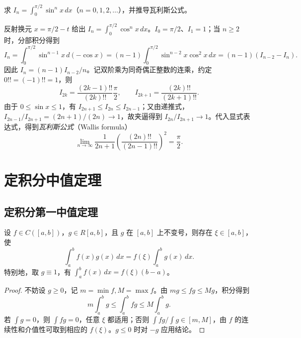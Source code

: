 \documentclass[UTF8,12pt,a4paper,fontset=fandol]{ctexbook}
\begin{document}
\begin{example}
\label{ex:wallis-recurrence-and-product}
求 $I_n=\int_0^{\pi/2}\sin^nx\,dx$（$n=0,1,2,\ldots$），并推导瓦利斯公式。
\end{example}
\begin{solve}
反射换元 $x=\pi/2-t$ 给出 $I_n=\int_0^{\pi/2}\cos^nx\,dx$。$I_0=\pi/2$、$I_1=1$；当 $n\geq2$ 时，分部积分得到
\[
    I_n=\int_0^{\pi/2}\sin^{n-1}x\,d(-\cos x)
    =(n-1)\int_0^{\pi/2}\sin^{n-2}x\cos^2x\,dx
    =(n-1)(I_{n-2}-I_n).
\]
因此 $I_n=(n-1)I_{n-2}/n$。记双阶乘为同奇偶正整数的连乘，约定 $0!!=(-1)!!=1$，则
\[
    I_{2k}=\frac{(2k-1)!!}{(2k)!!}\frac{\pi}{2},\qquad
    I_{2k+1}=\frac{(2k)!!}{(2k+1)!!}.
\]
由于 $0\leq\sin x\leq1$，有 $I_{2n+1}\leq I_{2n}\leq I_{2n-1}$；又由递推式，$I_{2n-1}/I_{2n+1}=(2n+1)/(2n)\to1$，故夹逼得到 $I_{2n}/I_{2n+1}\to1$。代入显式表达式，得到\emph{瓦利斯公式}（Wallis formula）
\begin{equation}
    \lim_{n\to\infty}
    \frac1{2n+1}\left(\frac{(2n)!!}{(2n-1)!!}\right)^2
    =\frac{\pi}{2}.
    \label{eq:wallis-product-limit}
\end{equation}
\end{solve}

\section{定积分中值定理}
\label{sec:integral-mean-value-theorems}

\subsection{定积分第一中值定理}
\label{subsec:first-integral-mean-value-theorem}

\begin{theorem}[定积分第一中值定理]
\label{thm:first-integral-mean-value}
设 $f\in C([a,b])$，$g\in R[a,b]$，且 $g$ 在 $[a,b]$ 上不变号，则存在 $\xi\in[a,b]$，使
\begin{equation}
    \int_a^b f(x)g(x)\,dx=f(\xi)\int_a^b g(x)\,dx.
    \label{eq:first-integral-mean-value}
\end{equation}
特别地，取 $g\equiv1$，有 $\int_a^b f(x)\,dx=f(\xi)(b-a)$。
\end{theorem}
\begin{proof}
不妨设 $g\geq0$，记 $m=\min f,M=\max f$。由 $mg\leq fg\leq Mg$，积分得到
\[
    m\int_a^b g\leq\int_a^b fg\leq M\int_a^b g.
\]
若 $\int g=0$，则 $\int fg=0$，任意 $\xi$ 都适用；否则 $\int fg/\int g\in[m,M]$，由 $f$ 的连续性和介值性可取到相应的 $f(\xi)$。$g\leq0$ 时对 $-g$ 应用结论。
\end{proof}
\end{document}
